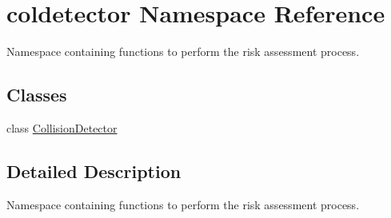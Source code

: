 \hypertarget{namespacecoldetector}{}\section{coldetector Namespace Reference}
\label{namespacecoldetector}


Namespace containing functions to perform the risk assessment process.  


\subsection*{Classes}
\begin{DoxyCompactItemize}
\item 
class \hyperlink{classcoldetector_1_1CollisionDetector}{Collision\+Detector}
\end{DoxyCompactItemize}


\subsection{Detailed Description}
Namespace containing functions to perform the risk assessment process. 